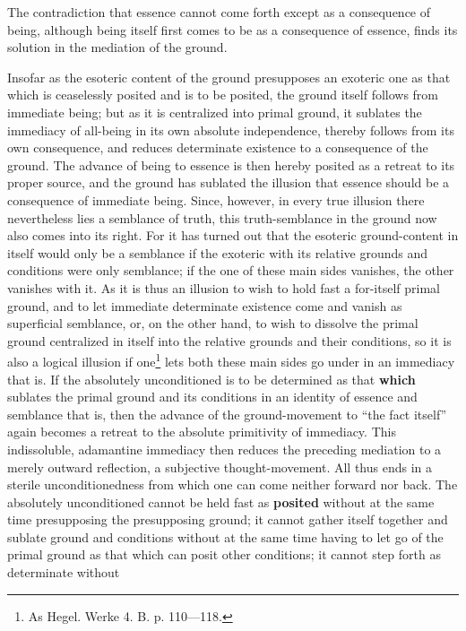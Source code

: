 \documentclass[12pt,a4paper,openany]{book}
\newcommand{\opage}[1]{\marginnote{\footnotesize\textit{[#1]}}}
\begin{document}
The contradiction that essence cannot come forth except
as a consequence of being, although being itself first comes
to be as a consequence of essence, finds its solution in
the mediation of the ground.

Insofar as the esoteric content of the ground presupposes
an exoteric one as that which is ceaselessly posited and is to be posited,
the ground itself follows from immediate being;
but as it is centralized into primal ground, it sublates
the immediacy of all-being in its own absolute independence,
thereby follows from its own consequence, and reduces
determinate existence to a consequence of the ground. The advance of being
to essence is then hereby posited as a retreat
to its proper source, and the ground has sublated
the illusion that essence should be a consequence
of immediate being. Since, however, in every true
illusion there nevertheless lies a semblance of truth,
this truth-semblance in the ground now also comes into
its right. For it has turned out that the esoteric
ground-content in itself would only be a semblance if
the exoteric with its relative grounds and conditions
were only semblance; if the one of these main sides vanishes,
the other vanishes with it. As it is thus
an illusion to wish to hold fast a for-itself
primal ground, and to let immediate determinate existence come
and vanish as superficial semblance, or, on the
other hand, to wish to dissolve the primal ground centralized in itself into
the relative grounds and their conditions, so it is
also a logical illusion if one\footnote{As Hegel. Werke 4. B. p. 110—118.} lets both these
main sides go under in an immediacy that is.
\setcounter{footnote}{0}%
\opage{143}If the absolutely unconditioned is to be determined as that \textbf{which} sublates the primal ground and its conditions in an identity of essence and semblance
that is, then the advance of the ground-movement
to ``the fact itself'' again becomes a retreat
to the absolute primitivity of immediacy. This
indissoluble, adamantine immediacy then reduces the
preceding mediation to a merely outward reflection,
a subjective thought-movement. All thus ends in a %
sterile unconditionedness from which one can come neither
forward nor back. The absolutely unconditioned cannot be
held fast as \textbf{posited} without at the same time presupposing the
presupposing ground; it cannot gather itself together and
sublate ground and conditions without at the same time having to
let go of the primal ground as that which can posit other conditions;
it cannot step forth as determinate without
\end{document}
